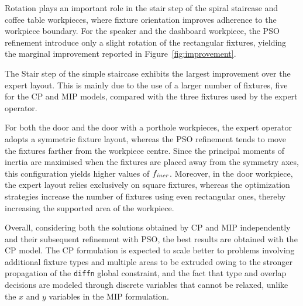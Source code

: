 Rotation plays an important role in the stair step of the spiral staircase and coffee table workpieces, where fixture orientation improves adherence to the workpiece boundary. For the speaker and the dashboard workpiece, the PSO refinement introduce only a slight rotation of the rectangular fixtures, yielding the marginal improvement reported in Figure~\ref{fig:improvement}.

The Stair step of the simple staircase exhibits the largest improvement over the expert layout. This is mainly due to the use of a larger number of fixtures, five for the CP and MIP models, compared with the three fixtures used by the expert operator.

For both the door and the door with a porthole workpieces, the expert operator adopts a symmetric fixture layout, whereas the PSO refinement tends to move the fixtures farther from the workpiece centre. Since the principal moments of inertia are maximised when the fixtures are placed away from the symmetry axes, this configuration yields higher values of $f_\mathit{iner}$. Moreover, in the door workpiece, the expert layout relies exclusively on square fixtures, whereas the optimization strategies increase the number of fixtures using even rectangular ones, thereby increasing the supported area of the workpiece.

Overall, considering both the solutions obtained by CP and MIP independently and their subsequent refinement with PSO, the best results are obtained with the CP model. The CP formulation is expected to scale better to problems involving additional fixture types and multiple areas to be extruded owing to the stronger propagation of the \texttt{diffn} global constraint, and the fact that type and overlap decisions are modeled through discrete variables that cannot be relaxed, unlike the $x$ and $y$ variables in the MIP formulation.

